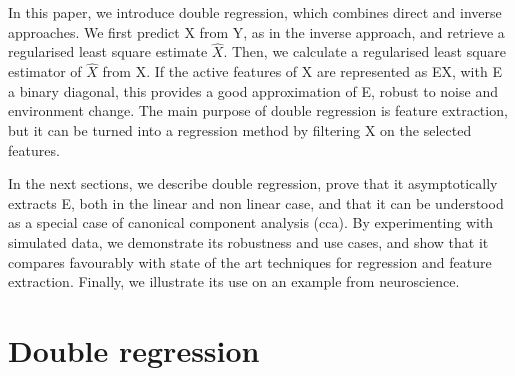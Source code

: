 \documentclass{article}
\begin{document}
In this paper, we introduce double regression, which combines direct and inverse approaches.
%
We first predict X from Y, as in the inverse approach, and retrieve a regularised least square estimate $\hat X$.
%
Then, we calculate a regularised least square estimator of $\hat X$ from X.
%
If the active features of X are represented as EX, with E a binary diagonal, this provides a good approximation of E, robust to noise and environment change.
%
The main purpose of double regression is feature extraction, but it can be turned into a regression method by filtering X on the selected features.

In the next sections, we describe double regression, prove that it asymptotically extracts E, both in the linear and non linear case, and that it can be understood as a special case of canonical component analysis (cca).
%
By experimenting with simulated data, we demonstrate its robustness and use cases, and show that it compares favourably with state of the art techniques for regression and feature extraction.
%
Finally, we illustrate its use on an example from neuroscience.

\section{Double regression}
\end{document}
